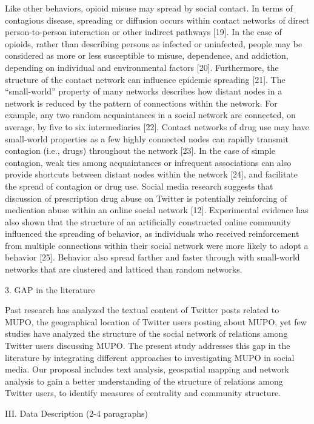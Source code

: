\documentclass[sigconf]{acmart}
\begin{document}
Like other behaviors, opioid misuse may spread by social contact. In terms of contagious disease, spreading or diffusion occurs within contact networks of direct person-to-person interaction or other indirect pathways [19]. In the case of opioids, rather than describing persons as infected or uninfected, people may be considered as more or less susceptible to misuse, dependence, and addiction, depending on individual and environmental factors [20]. Furthermore, the structure of the contact network can influence epidemic spreading [21]. The “small-world” property of many networks describes how distant nodes in a network is reduced by the pattern of connections within the network. For example, any two random acquaintances in a social network are connected, on average, by five to six intermediaries [22]. Contact networks of drug use may have small-world properties as a few highly connected nodes can rapidly transmit contagion (i.e., drugs) throughout the network [23]. In the case of simple contagion, weak ties among acquaintances or infrequent associations can also provide shortcuts between distant nodes within the network [24], and facilitate the spread of contagion or drug use. Social media research suggests that discussion of prescription drug abuse on Twitter is potentially reinforcing of medication abuse within an online social network [12]. Experimental evidence has also shown that the structure of an artificially constructed online community influenced the spreading of behavior, as individuals who received reinforcement from multiple connections within their social network were more likely to adopt a behavior [25]. Behavior also spread farther and faster through with small-world networks that are clustered and latticed than random networks.

3. GAP in the literature 

Past research has analyzed the textual content of Twitter posts related to MUPO, the geographical location of Twitter users posting about MUPO, yet few studies have analyzed the structure of the social network of relations among Twitter users discussing MUPO. The present study addresses this gap in the literature by integrating different approaches to investigating MUPO in social media. Our proposal includes text analysis, geospatial mapping and network analysis to gain a better understanding of the structure of relations among Twitter users, to identify measures of centrality and community structure. 

III. Data Description (2-4 paragraphs)
\end{document}
